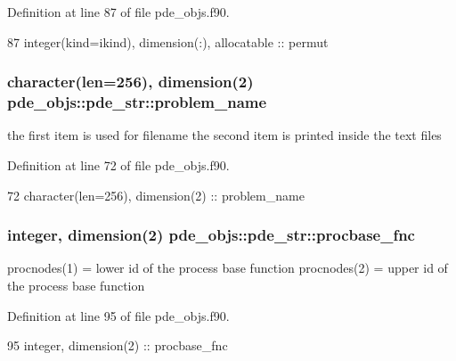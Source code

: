Definition at line 87 of file pde\+\_\+objs.\+f90.


\begin{DoxyCode}
87     \textcolor{keywordtype}{integer(kind=ikind)}, \textcolor{keywordtype}{dimension(:)}, \textcolor{keywordtype}{allocatable}   :: permut
\end{DoxyCode}
\subsubsection[{problem\+\_\+name}]{\setlength{\rightskip}{0pt plus 5cm}character(len=256), dimension(2) pde\+\_\+objs\+::pde\+\_\+str\+::problem\+\_\+name}\label{structpde__objs_1_1pde__str_a92431ff50603818733c295c189ff37ca}


the first item is used for filename the second item is printed inside the text files 



Definition at line 72 of file pde\+\_\+objs.\+f90.


\begin{DoxyCode}
72     \textcolor{keywordtype}{character(len=256)}, \textcolor{keywordtype}{dimension(2)}                 :: problem\_name
\end{DoxyCode}
\subsubsection[{procbase\+\_\+fnc}]{\setlength{\rightskip}{0pt plus 5cm}integer, dimension(2) pde\+\_\+objs\+::pde\+\_\+str\+::procbase\+\_\+fnc}\label{structpde__objs_1_1pde__str_a308d4affb05306ef24f227f1207ffc90}


procnodes(1) = lower id of the process base function procnodes(2) = upper id of the process base function 



Definition at line 95 of file pde\+\_\+objs.\+f90.


\begin{DoxyCode}
95     \textcolor{keywordtype}{integer}, \textcolor{keywordtype}{dimension(2)} :: procbase\_fnc
\end{DoxyCode}
